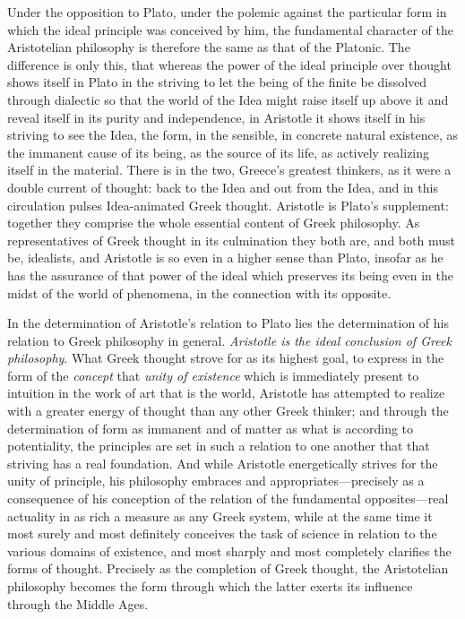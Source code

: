 Under the opposition to Plato, under the polemic against the particular
form in which the ideal principle was conceived by him, the fundamental
character of the Aristotelian philosophy is therefore the same as that
of the Platonic. The difference is only this, that whereas
the power of the ideal principle over thought shows itself
in Plato in the striving to let the being of the finite be dissolved
through dialectic so that the world of the Idea might raise itself up
above it and reveal itself in its purity and independence, in Aristotle
it shows itself in his striving to see the Idea, the form, in the
sensible, in concrete natural existence,
as the immanent cause of its being, as the source of its life, as
actively realizing itself in the material. There is in the two,
Greece's greatest thinkers, as it were a double current of thought:
back to the Idea and out from the Idea, and in this circulation pulses
Idea-animated Greek thought. Aristotle is Plato's supplement: together
they comprise the whole essential content of Greek philosophy. As
representatives of Greek thought in its culmination they both are, and
both must be, idealists, and Aristotle is so even in a higher sense
than Plato, insofar as he has the assurance of that power of the ideal
which preserves its being even in the midst of the world of phenomena,
in the connection with its opposite.

In the determination of Aristotle's relation to Plato lies the
determination of his relation to Greek philosophy in general.
\emph{Aristotle is the ideal conclusion of Greek philosophy}. What Greek
thought strove for as its highest goal, to express in the form of the
\emph{concept} that \emph{unity of existence} which is immediately
present to intuition in the work of art that is the world, Aristotle
has attempted to realize with a greater energy of thought than any
other Greek thinker; and through the determination of form as immanent
and of matter as what is according to potentiality, the principles are
set in such a relation to one another that that striving has a real
foundation. And while Aristotle energetically strives for the unity of
principle, his philosophy embraces and appropriates---precisely as a
consequence of his conception of the relation of the fundamental
opposites---real actuality in as rich a measure as any Greek system,
while at the same time it most surely and most definitely
conceives the task of science in relation to the various domains of
existence, and most sharply and most completely clarifies the forms of
thought. Precisely as the completion of Greek thought, the Aristotelian
philosophy becomes the form through which the latter exerts its
influence through the Middle Ages.

